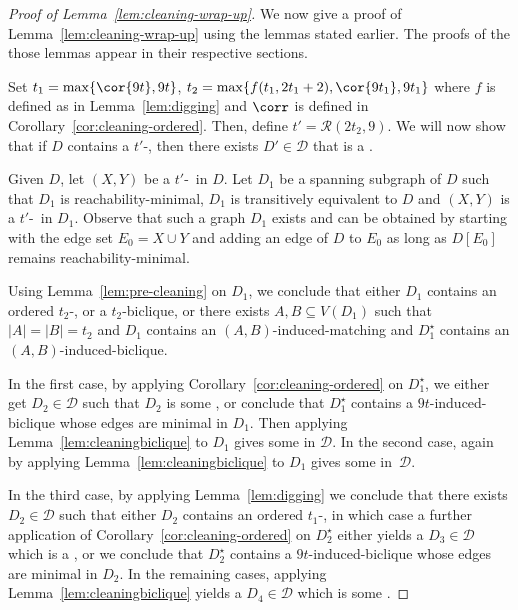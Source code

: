 \begin{proof}[Proof of Lemma~\ref{lem:cleaning-wrap-up}]
We now give a proof of Lemma~\ref{lem:cleaning-wrap-up} using the lemmas stated earlier. The proofs of the those lemmas appear in their respective sections.

Set $t_1 = \max\{\cor{9t},9t\}$, $t_2 =\max \{ f(t_1, 2t_1+2), \cor{9t_1}, 9t_1 \}$ where $f$ is defined as in Lemma~\ref{lem:digging} and $\corr$ is defined in Corollary~\ref{cor:cleaning-ordered}. Then, define $t' =  \mathcal{R}(2t_2,9)$. We will now show that if $D$ contains a $t'$-\toughpair, then there exists $D' \in \mathcal{D}$ that is a .

Given $D$, let $(X,Y)$ be a $t'$-\toughpair\ in $D$. Let $D_1$ be a spanning subgraph of $D$ such that $D_1$ is reachability-minimal, $D_1$ is transitively equivalent to $D$ and $(X,Y)$ is a $t'$-\toughpair\ in $D_1$. Observe that such a graph $D_1$ exists and can be obtained by starting with the edge set $E_0=X \cup Y$ and adding an edge of $D$ to $E_0$ as long as $D[E_0]$ remains reachability-minimal. 

Using Lemma~\ref{lem:pre-cleaning} on $D_1$, we conclude that either $D_1$ contains an ordered $t_2$-\toughpair, or a $t_2$-biclique, or there exists $A,B \subseteq V(D_1)$ such that $|A|=|B|=t_2$ and $D_1$ contains an $(A,B)$-induced-matching and $D_1^{\star}$ contains an $(A,B)$-induced-biclique. 

In the first case, by applying Corollary~\ref{cor:cleaning-ordered} on $D^{\star}_1$, we either get $D_2 \in \mathcal{D}$ such that $D_2$ is some , 
or conclude that $D^{\star}_1$ contains a $9t$-induced-biclique whose edges are minimal in $D_1$. Then applying Lemma~\ref{lem:cleaningbiclique} to $D_1$ gives some  in $\mathcal{D}$.
In the second case, again by applying Lemma~\ref{lem:cleaningbiclique} to $D_1$ gives some  in~$\mathcal{D}$.

In the third case, by applying Lemma~\ref{lem:digging} we conclude that there exists $D_2 \in \mathcal{D}$ such that either $D_2$ contains an ordered $t_1$-\toughpair, in which case a further application of Corollary~\ref{cor:cleaning-ordered} on $D^{\star}_2$ either yields a $D_3 \in \mathcal{D}$ which is a , or we conclude that $D^{\star}_2$ contains a $9t$-induced-biclique whose edges are minimal in $D_2$. In the remaining cases, applying Lemma~\ref{lem:cleaningbiclique} yields a $D_4 \in \mathcal{D}$ which is some .
\end{proof}

